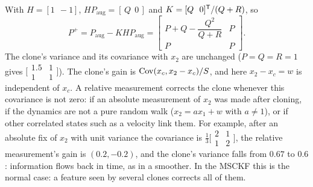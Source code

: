 \begin{solutions}
  \item With $H = [1\ \ -1]$, $HP_{\mathrm{aug}} = [\,Q\ \ 0\,]$ and $K = [Q\ \ 0]^{\mathsf{T}}/(Q + R)$, so
        \[
          P^+ = P_{\mathrm{aug}} - KHP_{\mathrm{aug}} = \begin{bmatrix} P + Q - \dfrac{Q^2}{Q + R} & P \\[1ex] P & P \end{bmatrix}.
        \]
        The clone's variance and its covariance with $x_2$ are unchanged ($P = Q = R = 1$ gives $\big[\begin{smallmatrix} 1.5 & 1 \\ 1 & 1\end{smallmatrix}\big]$). The clone's gain is
        $\operatorname{Cov}(x_c, x_2 - x_c)/S$, and here $x_2 - x_c = w$ is independent of $x_c$. A relative measurement corrects the clone whenever this covariance is not zero:
        if an absolute measurement of $x_2$ was made after cloning, if the dynamics are not a pure random walk ($x_2 = ax_1 + w$ with $a \ne 1$), or if other correlated
        states such as a velocity link them. For example, after an absolute fix of $x_2$ with unit variance the covariance is $\tfrac13\big[\begin{smallmatrix} 2 & 1 \\ 1 & 2\end{smallmatrix}\big]$, the
        relative measurement's gain is $(0.2, -0.2)$, and the clone's variance falls from $0.67$ to $0.6$: information flows back in time, as in a smoother. In the
        MSCKF this is the normal case: a feature seen by several clones corrects all of them.


\end{solutions}
